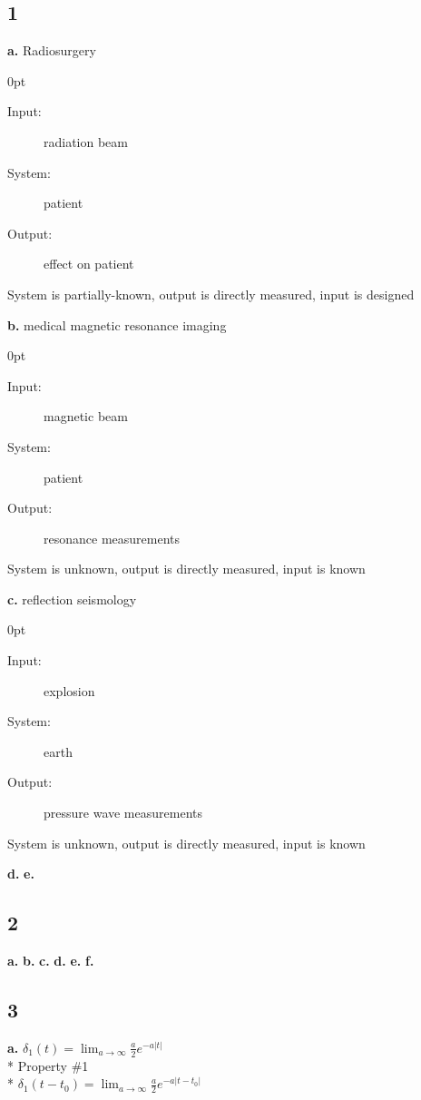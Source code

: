 \documentclass[10pt, letterpaper]{article}
\newcommand{\ind}[2]{
	\begin{addmargin}[#1]{0pt}
		{#2}
	\end{addmargin}
}
\begin{document}
\subsection*{1}
\textbf{a.} Radiosurgery

\ind{4 em}{
\begin{description}
    \item[Input:] radiation beam
    \item[System:] patient
    \item[Output:] effect on patient
\end{description}

System is partially-known, output is directly measured, input is designed
}

\textbf{b.} medical magnetic resonance imaging

\ind{4 em}{
\begin{description}
    \item[Input:] magnetic beam
    \item[System:] patient
    \item[Output:] resonance measurements
\end{description}

System is unknown, output is directly measured, input is known
}

\textbf{c.} reflection seismology

\ind{4 em}{
\begin{description}
    \item[Input:] explosion
    \item[System:] earth
    \item[Output:] pressure wave measurements
\end{description}

System is unknown, output is directly measured, input is known
}

\textbf{d.}
\textbf{e.}
\subsection*{2}

\textbf{a.}
\textbf{b.}
\textbf{c.}
\textbf{d.}
\textbf{e.}
\textbf{f.}
\subsection*{3}
\textbf{a.}
$\delta_1(t) = \lim_{a \to \infty} \frac{a}{2} e^{-a|t|}$\\*
Property \#1 \\*
$\delta_1(t - t_0) = \lim_{a \to \infty} \frac{a}{2} e^{-a|t - t_0|}$
\end{document}
